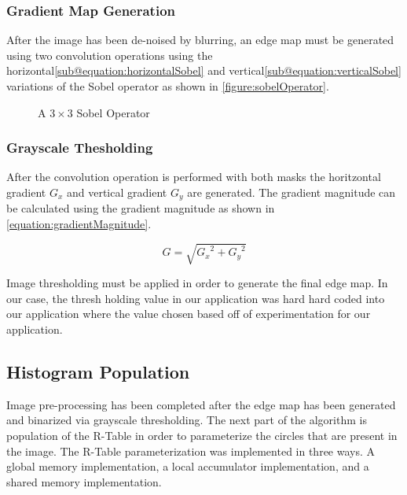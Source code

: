 \documentclass[conference]{IEEEtran}
\begin{document}
\subsubsection{Gradient Map Generation}
After the image has been de-noised by blurring, an edge map must be generated using two convolution operations using the horizontal\ref*{sub@equation:horizontalSobel} and  vertical\ref*{sub@equation:verticalSobel} variations of the Sobel operator as shown in \autoref{figure:sobelOperator}.
\begin{figure}[h] %
  \centering
  \hfil
  \caption{A $3 \times 3$ Sobel Operator}\label{figure:sobelOperator}
\end{figure}

\subsubsection{Grayscale Thesholding}
After the convolution operation is performed with both masks the horitzontal gradient $G_x$ and vertical gradient $G_y$ are generated. 
The gradient magnitude can be calculated using the gradient magnitude as shown in \autoref{equation:gradientMagnitude}.

\begin{equation}
  G = \sqrt{{G_x}^2 + {G_y}^2}\label{equation:gradientMagnitude}
\end{equation}

Image thresholding must be applied in order to generate the final edge map.
In our case, the thresh holding value in our application was hard hard coded into our application where the value chosen based off of experimentation for our application.


\subsection{Histogram Population}
Image pre-processing has been completed after the edge map has been generated and binarized via grayscale thresholding.
The next part of the algorithm is population of the R-Table in order to parameterize the circles that are present in the image.
The R-Table parameterization was implemented in three ways. A global memory implementation, a local accumulator implementation, and a shared memory implementation.
\end{document}
